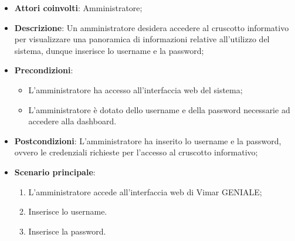 \begin{itemize}
    \item \textbf{Attori coinvolti}: Amministratore;
    \item \textbf{Descrizione}: Un amministratore desidera accedere al cruscotto informativo per visualizzare una panoramica di informazioni relative all’utilizzo del sistema, dunque inserisce lo username e la password;
    \item \textbf{Precondizioni}: 
        \begin{itemize}
            \item L’amministratore ha accesso all’interfaccia web del sistema;
            \item L’amministratore è dotato dello username e della password necessarie ad accedere alla dashboard.
        \end{itemize}
    \item \textbf{Postcondizioni}: L’amministratore ha inserito lo username e la password, ovvero le credenziali richieste per l’accesso al cruscotto informativo;
    \item \textbf{Scenario principale}:
    \begin{enumerate}
    \item L’amministratore accede all’interfaccia web di Vimar GENIALE;
    \item Inserisce lo username.
    \item Inserisce la password.
    \end{enumerate}
\end{itemize}


